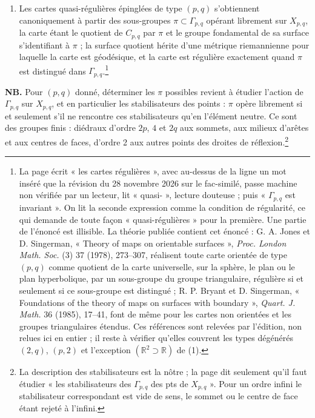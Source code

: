 \documentclass[11pt,a4paper]{article}
\begin{document}
\begin{enumerate}
\item[(7)] Les cartes quasi-régulières épinglées de type $(p,q)$ s'obtiennent
canoniquement à partir des sous-groupes $\pi \subset \Gamma_{p,q}$ opérant
librement sur $X_{p,q}$, la carte étant le quotient de $C_{p,q}$ par $\pi$ et
le groupe fondamental de sa surface s'identifiant à $\pi$ ; la surface
quotient hérite d'une métrique riemannienne pour laquelle la carte est
géodésique, et la carte est régulière exactement quand $\pi$ est distingué
dans $\Gamma_{p,q}$.\footnote{La page écrit « les cartes régulières », avec
au-dessus de la ligne un mot inséré que la révision du 28 novembre 2026 sur le fac-similé, passe machine non vérifiée par un lecteur,
lit « quasi- », lecture douteuse ; puis « $\Gamma_{p,q}$ est invariant ». On lit
la seconde expression comme la condition de régularité, ce qui demande de
toute façon « quasi-régulières » pour la première. Une partie de l'énoncé est
illisible. La théorie
publiée contient cet énoncé : G. A. Jones et D. Singerman, « Theory of maps
on orientable surfaces », \emph{Proc. London Math. Soc.} (3) 37 (1978),
273--307, réalisent toute carte orientée de type $(p,q)$ comme quotient de la
carte universelle, sur la sphère, le plan ou le plan hyperbolique, par un
sous-groupe du groupe triangulaire, régulière si et seulement si ce
sous-groupe est distingué ; R. P. Bryant et D. Singerman, « Foundations of the
theory of maps on surfaces with boundary », \emph{Quart. J. Math.} 36 (1985),
17--41, font de même pour les cartes non orientées et les groupes
triangulaires étendus. Ces références sont relevées par l'édition, non
relues ici en entier ; il reste à vérifier qu'elles couvrent les types
dégénérés $(2,q)$, $(p,2)$ et l'exception $(\mathbb{R}^{2} \supset
\mathbb{R})$ de (1).}
\end{enumerate}

\textbf{NB.} Pour $(p,q)$ donné, déterminer les $\pi$ possibles revient à
étudier l'action de $\Gamma_{p,q}$ sur $X_{p,q}$, et en particulier les
stabilisateurs des points : $\pi$ opère librement si et seulement s'il ne
rencontre ces stabilisateurs qu'en l'élément neutre. Ce sont des groupes
finis : diédraux d'ordre $2p$, $4$ et $2q$ aux sommets, aux milieux d'arêtes et
aux centres de faces, d'ordre 2 aux autres points des droites de
réflexion.\footnote{La description des stabilisateurs est la nôtre ; la page
dit seulement qu'il faut étudier « les stabilisateurs des $\Gamma_{p,q}$ des
pts de $X_{p,q}$ ». Pour un ordre infini le stabilisateur correspondant est
vide de sens, le sommet ou le centre de face étant rejeté à l'infini.}
\end{document}

